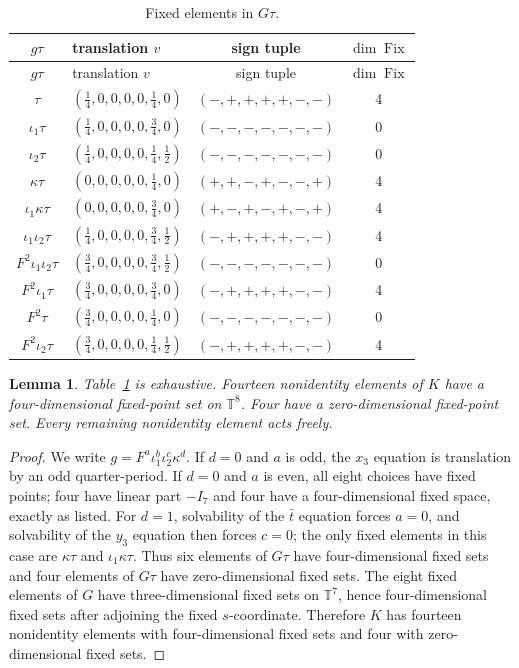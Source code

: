 \documentclass[11pt]{article}
\newtheorem{lemma}[theorem]{Lemma}
\theoremstyle{remark}\newtheorem{remark}[theorem]{Remark}
\newcommand{\Fix}{\operatorname{Fix}}
\newcommand{\T}{\mathbb T}
\begin{document}
\pagebreak[4]
\begin{longtable}{@{}c>{\raggedright\arraybackslash}p{}c c@{}}
\caption{Fixed elements in $G\tau$.}\label{tab:coset-fixed}\\
\toprule $g\tau$&translation $v$&sign tuple&$\dim\Fix$\\\midrule\endfirsthead
\toprule $g\tau$&translation $v$&sign tuple&$\dim\Fix$\\\midrule\endhead
$\tau$&$(\frac14,0,0,0,0,\frac14,0)$&$(-,+,+,+,+,-,-)$&4\\
$\iota_1\tau$&$(\frac14,0,0,0,0,\frac34,0)$&$(-,-,-,-,-,-,-)$&0\\
$\iota_2\tau$&$(\frac14,0,0,0,0,\frac14,\frac12)$&$(-,-,-,-,-,-,-)$&0\\
$\kappa\tau$&$(0,0,0,0,0,\frac14,0)$&$(+,+,-,+,-,-,+)$&4\\
$\iota_1\kappa\tau$&$(0,0,0,0,0,\frac34,0)$&$(+,-,+,-,+,-,+)$&4\\
$\iota_1\iota_2\tau$&$(\frac14,0,0,0,0,\frac34,\frac12)$&$(-,+,+,+,+,-,-)$&4\\
$F^2\iota_1\iota_2\tau$&$(\frac34,0,0,0,0,\frac34,\frac12)$&$(-,-,-,-,-,-,-)$&0\\
$F^2\iota_1\tau$&$(\frac34,0,0,0,0,\frac34,0)$&$(-,+,+,+,+,-,-)$&4\\
$F^2\tau$&$(\frac34,0,0,0,0,\frac14,0)$&$(-,-,-,-,-,-,-)$&0\\
$F^2\iota_2\tau$&$(\frac34,0,0,0,0,\frac14,\frac12)$&$(-,+,+,+,+,-,-)$&4\\
\bottomrule
\end{longtable}

\begin{lemma}\label{lem:coset-exhaustive}
Table~\ref{tab:coset-fixed} is exhaustive.  Fourteen nonidentity elements
of $K$ have a four-dimensional fixed-point set on $\T^8$.  Four have a
zero-dimensional fixed-point set.  Every remaining nonidentity element
acts freely.
\end{lemma}
\begin{proof}
We write $g=F^a\iota_1^b\iota_2^c\kappa^d$.  If $d=0$ and $a$ is odd, the
$x_3$ equation is translation by an odd quarter-period.  If $d=0$ and $a$
is even, all eight choices have fixed points; four have linear part $-I_7$
and four have a four-dimensional fixed space, exactly as listed.  For
$d=1$, solvability of the $\bar t$ equation forces $a=0$, and solvability
of the $y_3$ equation then forces $c=0$; the only fixed elements in this
case are $\kappa\tau$ and $\iota_1\kappa\tau$.  Thus six elements of
$G\tau$ have four-dimensional fixed sets and four elements of $G\tau$ have
zero-dimensional fixed sets.  The eight fixed elements of $G$ have
three-dimensional fixed sets on $\T^7$, hence four-dimensional fixed sets
after adjoining the fixed $s$-coordinate.  Therefore $K$ has fourteen
nonidentity elements with four-dimensional fixed sets and four with
zero-dimensional fixed sets.
\end{proof}
\end{document}
